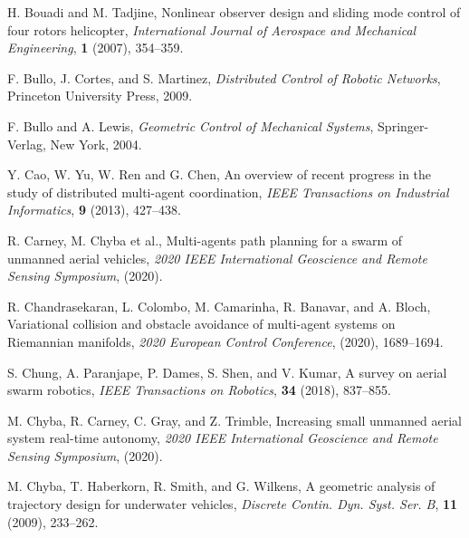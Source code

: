\documentclass{aims}
\theoremstyle{definition}
\begin{document}
\begin{thebibliography}{99}
     \newblock H. Bouadi and M. Tadjine, 
     \newblock Nonlinear observer design and sliding mode control of four rotors helicopter,
     \newblock \emph{International Journal of  Aerospace and Mechanical Engineering}, \textbf{1} (2007), 354--359.

    
    \newblock F. Bullo, J. Cortes, and S. Martinez,
    \newblock \emph{Distributed Control of Robotic Networks},
    \newblock %
    Princeton University Press, 2009.

     \newblock F. Bullo and A. Lewis,
     \newblock \emph{Geometric Control of Mechanical Systems}, 
     \newblock Springer-Verlag, New York, 2004.


    \newblock Y. Cao, W. Yu, W. Ren and G. Chen,
    \newblock An overview of recent progress in the study of distributed multi-agent coordination,
    \newblock \emph{IEEE Transactions on Industrial Informatics}, \textbf{9} (2013), 427--438.
    
    \newblock R. Carney, M. Chyba et al.,
    \newblock Multi-agents path planning for a swarm of unmanned aerial vehicles, %
    \newblock \emph{2020 IEEE International Geoscience and Remote Sensing Symposium}, (2020).

    \newblock R. Chandrasekaran, L. Colombo, M. Camarinha, R. Banavar, and A. Bloch,
    \newblock Variational collision and obstacle avoidance of multi-agent systems on Riemannian manifolds,
    \newblock %
     \emph{2020 European Control Conference}, (2020), 1689--1694.

    \newblock S. Chung, A. Paranjape, P. Dames, S. Shen, and V. Kumar,
    \newblock A survey on aerial swarm robotics,
    \newblock \emph{IEEE Transactions on Robotics}, \textbf{34} (2018), 837--855.
    
    \newblock M. Chyba, R. Carney, C. Gray, and Z. Trimble,
    \newblock Increasing small unmanned aerial system real-time autonomy,
    \newblock \emph{2020 IEEE International Geoscience and Remote Sensing Symposium}, (2020).

     \newblock  M. Chyba, T. Haberkorn, R. Smith, and G. Wilkens,
     \newblock A geometric analysis of trajectory design for underwater vehicles,
     \newblock \emph{Discrete Contin. Dyn. Syst. Ser. B}, \textbf{11} (2009), 233--262.


\end{thebibliography}
\end{document}

